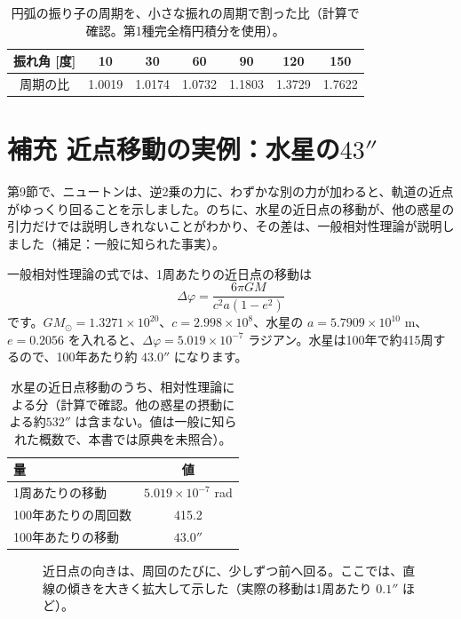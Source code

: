 \documentclass[a4paper,11pt,openany]{ltjsbook}
\begin{document}
\begin{table}[htbp]
\centering
\begin{tabular}{c|cccccc}
\toprule
振れ角 [度] & 10 & 30 & 60 & 90 & 120 & 150\\
\midrule
周期の比 & 1.0019 & 1.0174 & 1.0732 & 1.1803 & 1.3729 & 1.7622\\
\bottomrule
\end{tabular}
\caption{円弧の振り子の周期を、小さな振れの周期で割った比（計算で確認。第1種完全楕円積分を使用）。}
\end{table}

\section{補充 近点移動の実例：水星の$43''$}

第9節で、ニュートンは、逆2乗の力に、わずかな別の力が加わると、軌道の近点がゆっくり回ることを示しました。のちに、水星の近日点の移動が、他の惑星の引力だけでは説明しきれないことがわかり、その差は、一般相対性理論が説明しました（補足：一般に知られた事実）。

一般相対性理論の式では、1周あたりの近日点の移動は
\[
\Delta\varphi=\frac{6\pi GM}{c^2a(1-e^2)}
\]
です。$GM_\odot=1.3271\times10^{20}$、$c=2.998\times10^8$、水星の $a=5.7909\times10^{10}$ m、$e=0.2056$ を入れると、$\Delta\varphi=5.019\times10^{-7}$ ラジアン。水星は100年で約415周するので、100年あたり約 $43.0''$ になります。

\begin{table}[htbp]
\centering
\begin{tabular}{lc}
\toprule
量 & 値\\
\midrule
1周あたりの移動 & $5.019\times10^{-7}$ rad\\
100年あたりの周回数 & 415.2\\
100年あたりの移動 & $43.0''$\\
\bottomrule
\end{tabular}
\caption{水星の近日点移動のうち、相対性理論による分（計算で確認。他の惑星の摂動による約$532''$ は含まない。値は一般に知られた概数で、本書では原典を未照合）。}
\end{table}

\begin{figure}[htbp]
\centering
{}
\caption{近日点の向きは、周回のたびに、少しずつ前へ回る。ここでは、直線の傾きを大きく拡大して示した（実際の移動は1周あたり $0.1''$ ほど）。}
\end{figure}
\end{document}

